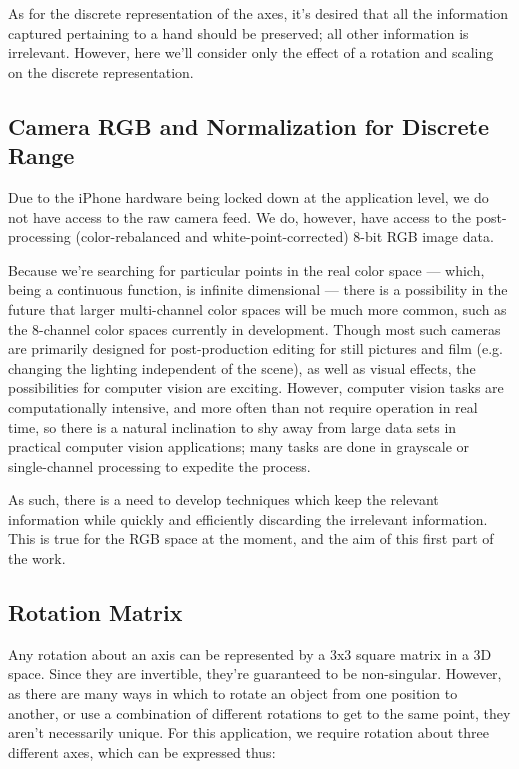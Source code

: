 As for the discrete representation of the axes, it's desired that all the information captured pertaining to a hand should be preserved; all other information is irrelevant. However, here we'll consider only the effect of a rotation and scaling on the discrete representation.


\subsection{Camera RGB and Normalization for Discrete Range}\label{sec:CameraRGB}

Due to the iPhone hardware being locked down at the application level, we do not have access to the raw camera feed. We do, however, have access to the post-processing (color-rebalanced and white-point-corrected) 8-bit RGB image data.

Because we're searching for particular points in the real color space --- which, being a continuous function, is infinite dimensional --- there is a possibility in the future that larger multi-channel color spaces will be much more common, such as the 8-channel color spaces currently in development. Though most such cameras are primarily designed for post-production editing for still pictures and film (e.g. changing the lighting independent of the scene), as well as visual effects, the possibilities for computer vision are exciting. However, computer vision tasks are computationally intensive, and more often than not require operation in real time, so there is a natural inclination to shy away from large data sets in practical computer vision applications; many tasks are done in grayscale or single-channel processing to expedite the process.

As such, there is a need to develop techniques which keep the relevant information while quickly and efficiently discarding the irrelevant information. This is true for the RGB space at the moment, and the aim of this first part of the work.


\subsection{Rotation Matrix}\label{sec:RotationMatrix}
Any rotation about an axis can be represented by a 3x3 square matrix in a 3D space. Since they are invertible, they're guaranteed to be non-singular. However, as there are many ways in which to rotate an object from one position to another, or use a combination of different rotations to get to the same point, they aren't necessarily unique. For this application, we require rotation about three different axes, which can be expressed thus:


